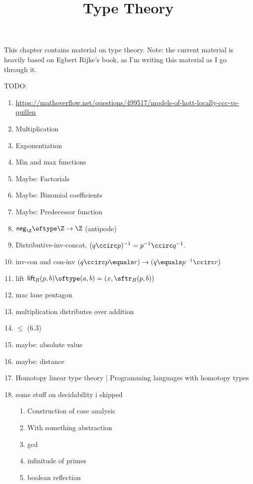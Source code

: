 

%



\title{Type Theory}

\maketitle

\label{section-phantom}

This chapter contains material on type theory. Note: the current material is heavily based on Egbert Rijke's book, as I'm writing this material as I go through it.

\ChapterTableOfContents

TODO:
\begin{enumerate}
    \item \url{https://mathoverflow.net/questions/499517/models-of-hott-locally-ccc-vs-quillen}
    \item Multiplication
    \item Exponentiation
    \item Min and max functions
    \item Maybe: Factorials
    \item Maybe: Binomial coefficients
    \item Maybe: Predecessor function
    \item $\mathsf{neg}_{\Z}\oftype\Z\to\Z$ (antipode)
    \item Distributive-inv-concat, $(q\ccirc p)^{-1}=p^{-1}\ccirc q^{-1}$.
    \item inv-con and con-inv $(q\ccirc p\equals r)\to(q\equals p^{-1}\ccirc r)$
    \item lift $\mathsf{lift}_{B}(p,b)\oftype (a,b)=(x,\sftr_{B}(p,b))$
    \item mac lane pentagon
    \item multiplication distributes over addition
    \item $\leq$ (6.3)
    \item maybe: absolute value
    \item maybe: distance
    \item Homotopy linear type theory | Programming languages with homotopy types
    \item some stuff on decidability i skipped
        \begin{enumerate}
            \item Construction of case analysis
            \item With something abstraction
            \item gcd
            \item infinitude of primes
            \item boolean reflection
        \end{enumerate}
\end{enumerate}

